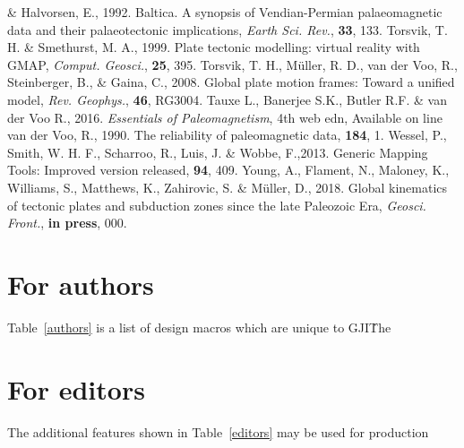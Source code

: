 \begin{thebibliography}{}
  \& Halvorsen, E., 1992. Baltica. A synopsis of Vendian-Permian palaeomagnetic
  data and their palaeotectonic implications, \textit{Earth Sci. Rev.},
  \textbf{33}, 133.
  Torsvik, T. H. \& Smethurst, M. A., 1999. Plate tectonic modelling: virtual
  reality with GMAP, \textit{Comput. Geosci.}, \textbf{25}, 395.
  Torsvik, T. H., M{\"{u}}ller, R. D., van der Voo, R., Steinberger, B., \&
  Gaina, C., 2008. Global plate motion frames: Toward a unified model,
  \textit{Rev. Geophys.}, \textbf{46}, RG3004.
  Tauxe L., Banerjee S.K., Butler R.F. \& van der Voo R., 2016.
  \textit{Essentials of Paleomagnetism}, 4th web edn, Available on line
  van der Voo, R., 1990. The reliability of paleomagnetic data,
  \tecto{}\textbf{184}, 1.
  Wessel, P., Smith, W. H. F., Scharroo, R., Luis, J. \& Wobbe, F.,2013. Generic
  Mapping Tools: Improved version released, \eos{}\textbf{94}, 409.
  Young, A., Flament, N., Maloney, K., Williams, S., Matthews, K., Zahirovic,
  S.
  \& Müller, D., 2018. Global kinematics of tectonic plates and subduction zones
  since the late Paleozoic Era, \textit{Geosci. Front.},
  \textbf{in press}, 000.
\end{thebibliography}


\appendix
\section{For authors}

Table~\ref{authors} is a list of design macros which are unique to GJI\. The

\section{For editors}

The additional features shown in Table~\ref{editors} may be used for production

\bsp{} %
~\label{lastpage}
